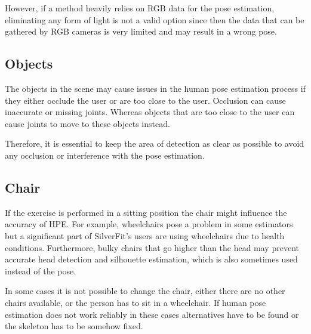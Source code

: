 However, if a method heavily relies on RGB data for the pose estimation, eliminating any form of light is not a valid option since then the data that can be gathered by RGB cameras is very limited and may result in a wrong pose.

\subsection{Objects}

The objects in the scene may cause issues in the human pose estimation process if they either occlude the user or are too close to the user. Occlusion can cause inaccurate or missing joints. Whereas objects that are too close to the user can cause joints to move to these objects instead.

Therefore, it is essential to keep the area of detection as clear as possible to avoid any occlusion or interference with the pose estimation.

\subsection{Chair}

If the exercise is performed in a sitting position the chair might influence the accuracy of HPE. For example, wheelchairs pose a problem in some estimators but a significant part of SilverFit's users are using wheelchairs due to health conditions. Furthermore, bulky chairs that go higher than the head may prevent accurate head detection and silhouette estimation, which is also sometimes used instead of the pose.

In some cases it is not possible to change the chair, either there are no other chairs available, or the person has to sit in a wheelchair. If human pose estimation does not work reliably in these cases alternatives have to be found or the skeleton has to be somehow fixed.